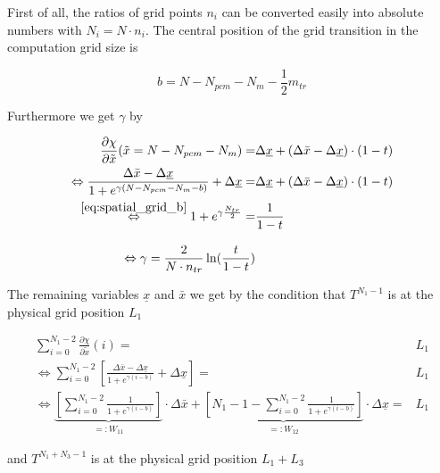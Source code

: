 \documentclass{scrartcl}[12pt, halfparskip]
\begin{document}
First of all, the ratios of grid points $n_i$ can be converted easily into absolute numbers with $N_i = N \cdot n_i$. The central position of the grid transition in the computation grid size is

\begin{equation}
	b = N - N_{pcm} - N_m - \frac{1}{2} m_{tr}
	\label{eq:spatial_grid_b}
\end{equation}

Furthermore we get $\gamma$ by

\begin{subequations}
\begin{align}
	\frac{\partial \chi}{\partial \tilde{x}}(\tilde{x}=N-N_{pcm}-N_m) = & \Delta \underline{x} + (\Delta \bar{x} - \Delta \underline{x}) \cdot (1-t) \\
	\Leftrightarrow \frac{\Delta \bar{x} - \Delta \underline{x}}{1 + e^{\gamma(N-N_{pcm}-N_m - b)}} + \Delta \underline{x} = & \Delta \underline{x} + (\Delta \bar{x} - \Delta \underline{x}) \cdot (1-t)  \\
	\stackrel{\eqref{eq:spatial_grid_b}}{\Leftrightarrow}  1 + e^{\gamma \frac{N_{tr}}{2}} = & \frac{1}{1 - t}  \\[2ex]
	\Leftrightarrow \gamma = \frac{2}{N \cdot n_{tr}} \ln(\frac{t}{1-t})
\end{align}
\end{subequations}

The remaining variables $\underline{x}$ and $\bar{x}$ we get by the condition that $T^{N_1-1}$ is at the physical grid position $L_1$

\begin{subequations}
	\begin{align}
	\sum_{i=0}^{N_1 - 2} \frac{\partial \chi}{\partial \tilde{x}}(i) = & L_1 \\
	\Leftrightarrow \sum_{i=0}^{N_1 - 2} \left[ \frac{\Delta \bar{x} - \Delta \underline{x}}{1 + e^{\gamma(i - b)}} + \Delta \underline{x} \right] = & L_1 \\
	\Leftrightarrow \underbrace{ \left[ \sum_{i=0}^{N_1 - 2} \frac{1}{1 + e^{\gamma(i - b)}} \right] }_{=: W_{11}} \cdot \Delta \bar{x} + \underbrace{\left[ N_1 - 1 - \sum_{i=0}^{N_1 - 2} \frac{1}{1 + e^{\gamma(i - b)}} \right]}_{=: W_{12}} \cdot \Delta \underline{x} = & L_1
	\end{align}
\end{subequations}

and $T^{N_1+N_3-1}$ is at the physical grid position $L_1+L_3$
\end{document}
